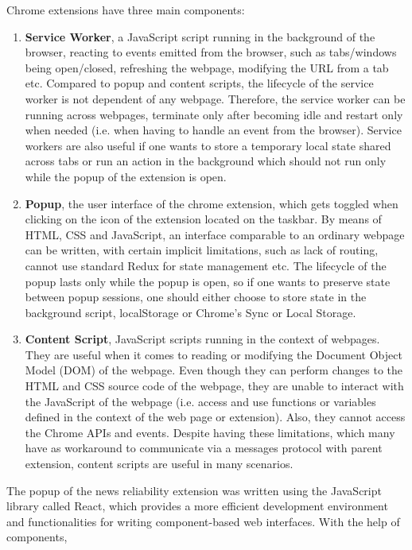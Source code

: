   Chrome extensions have three main components:
  \begin{enumerate}
    \item \textbf{Service Worker}, a JavaScript script running in the background of the browser, reacting to events emitted from the browser, such as tabs/windows being open/closed, refreshing the webpage, modifying the URL from a tab etc. Compared to popup and content scripts, the lifecycle of the service worker is not dependent of any webpage. Therefore, the service worker can be running across webpages, terminate only after becoming idle and restart only when needed (i.e. when having to handle an event from the browser). Service workers are also useful if one wants to store a temporary local state shared across tabs or run an action in the background which should not run only while the popup of the extension is open.
    \item \textbf{Popup}, the user interface of the chrome extension, which gets toggled when clicking on the icon of the extension located on the taskbar. By means of HTML, CSS and JavaScript, an interface comparable to an ordinary webpage can be written, with certain implicit limitations, such as lack of routing, cannot use standard Redux for state management etc. The lifecycle of the popup lasts only while the popup is open, so if one wants to preserve state between popup sessions, one should either choose to store state in the background script, localStorage or Chrome's Sync or Local Storage.
    \item \textbf{Content Script}, JavaScript scripts running in the context of webpages. They are useful when it comes to reading or modifying the Document Object Model (DOM) of the webpage. Even though they can perform changes to the HTML and CSS source code of the webpage, they are unable to interact with the JavaScript of the webpage (i.e. access and use functions or variables defined in the context of the web page or extension). Also, they cannot access the Chrome APIs and events. Despite having these limitations, which many have as workaround to communicate via a messages protocol with parent extension, content scripts are useful in many scenarios.
  \end{enumerate}

  The popup of the news reliability extension was written using the JavaScript library called React, which provides a more efficient development environment and functionalities for writing component-based web interfaces. With the help of components, 

